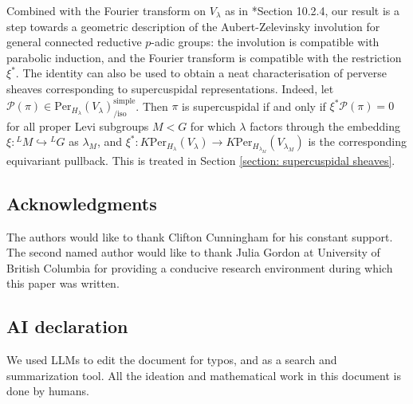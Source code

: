 \documentclass[11pt,letterpaper]{amsart}
\newcommand{\Per}{\mathrm{Per}}
\renewcommand{\1}{\mathbbm{1}}
\numberwithin{equation}{section}
\begin{document}
Combined with the Fourier transform on $V_\lambda$ as in \cite{CFMMX22}*{Section 10.2.4}, our result is a step towards a geometric description of the Aubert-Zelevinsky involution for general connected reductive $p$-adic groups: the involution is compatible with parabolic induction, and the Fourier transform is compatible with the restriction $\xi^*$. The identity can also be used to obtain a neat characterisation of perverse sheaves corresponding to supercuspidal representations. Indeed, let $\mathcal{P}(\pi) \in \Per_{H_\lambda}(V_\lambda)_{/\text{iso}}^{\mathrm{simple}}$. Then $\pi$ is supercuspidal if and only if $\xi^*\mathcal{P}(\pi)=0$ for all  proper Levi subgroups $M <G$ for which $\lambda$ factors through the embedding $\xi:{}^L M \hookrightarrow {}^L G$ as $\lambda_M$, and $\xi^*:K\Per_{H_\lambda}(V_\lambda)\to K\Per_{H_{\lambda_M}}(V_{\lambda_M})$ is the corresponding equivariant pullback. This is treated in Section \ref{section: supercuspidal sheaves}.



\subsection{Acknowledgments} 
The authors would like to thank Clifton Cunningham for his constant support.
The second named author would like to thank Julia Gordon at University of British Columbia for providing a conducive research environment during which this paper was written.
\subsection{AI declaration}
We used LLMs to edit the document for typos, and as a search and summarization tool. All the ideation and mathematical work in this document is done by humans.
\iffalse
\end{document}
